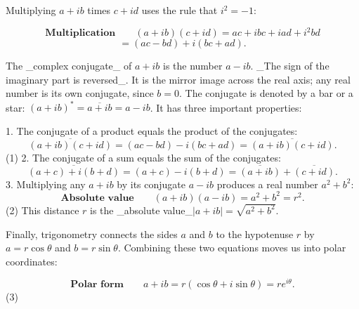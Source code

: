 Multiplying \(a+ib\) times \(c+id\) uses the rule that \(i^{2}=-1\):

\[\textbf{Multiplication}\qquad(a+ib)(c+id) =ac+ibc+iad+i^{2}bd\] \[=(ac-bd)+i(bc+ad).\]

The _complex conjugate_ of \(a+ib\) is the number \(a-ib\). _The sign of the imaginary part is reversed_. It is the mirror image across the real axis; any real number is its own conjugate, since \(b=0\). The conjugate is denoted by a bar or a star: \((a+ib)^{*}=\overline{a+ib}=a-ib\). It has three important properties:

1. The conjugate of a product equals the product of the conjugates: \[\overline{(a+ib)(c+id)}=(ac-bd)-i(bc+ad)=\overline{(a+ib)(c+id)}.\] (1)
2. The conjugate of a sum equals the sum of the conjugates: \[\overline{(a+c)+i(b+d)}=(a+c)-i(b+d)=\overline{(a+ib)}+\overline{(c+id)}.\]
3. Multiplying any \(a+ib\) by its conjugate \(a-ib\) produces a real number \(a^{2}+b^{2}\): \[\textbf{Absolute value}\qquad(a+ib)(a-ib)=a^{2}+b^{2}=r^{2}.\] (2) This distance \(r\) is the _absolute value_\(|a+ib|=\sqrt{a^{2}+b^{2}}\).

Finally, trigonometry connects the sides \(a\) and \(b\) to the hypotenuse \(r\) by \(a=r\cos\theta\) and \(b=r\sin\theta\). Combining these two equations moves us into polar coordinates:

\[\textbf{Polar form}\qquad a+ib=r(\cos\theta+i\sin\theta)=re^{i\theta}.\] (3) 